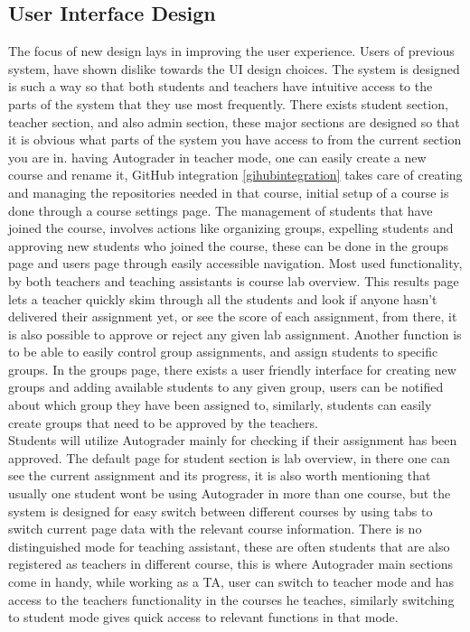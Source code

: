 \subsection{User Interface Design}




The focus of new design lays in improving the user experience. Users of previous system, have shown dislike towards the UI design choices. The system is designed is such a way so that both students and teachers have intuitive access to the parts of the system that they use most frequently. There exists student section, teacher section, and also admin section, these major sections are designed so that it is obvious what parts of the system you have access to from the current section you are in. having Autograder in teacher mode, one can easily create a new course and rename it, GitHub integration \ref{gihubintegration} takes care of creating and managing the repositories needed in that course, initial setup of a course is done through a course settings page. The management of students that have joined the course, involves actions like organizing groups, expelling students and approving new students who joined the course, these can be done in the groups page and users page through easily accessible navigation. Most used functionality, by both teachers and teaching assistants is course lab overview. This results page lets a teacher quickly skim through all the students and look if anyone hasn't delivered their assignment yet, or see the score of each assignment, from there, it is also possible to approve or reject any given lab assignment. Another function is to be able to easily control group assignments, and assign students to specific groups. In the groups page, there exists a user friendly interface for creating new groups and adding available students to any given group, users can be notified about which group they have been assigned to, similarly, students can easily create groups that need to be approved by the teachers.
\\Students will utilize Autograder mainly for checking if their assignment has been approved. The default page for student section is lab overview, in there one can see the current assignment and its progress, it is also worth mentioning that usually one student wont be using Autograder in more than one course, but the system is designed for easy switch between different courses by using tabs to switch current page data with the relevant course information. There is no distinguished mode for teaching assistant, these are often students that are also registered as teachers in different course, this is where Autograder main sections come in handy, while working as a TA, user can switch to teacher mode and has access to the teachers functionality in the courses he teaches, similarly switching to student mode gives quick access to relevant functions in that mode.
